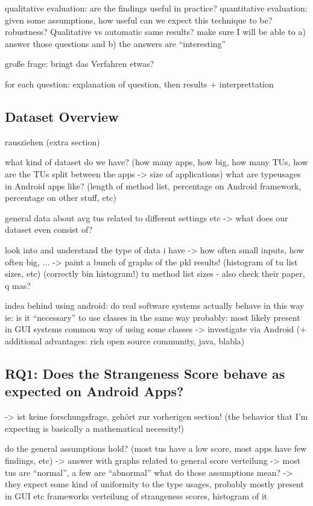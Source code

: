 qualitative evaluation: are the findings useful in practice?
quantitative evaluation: given some assumptions, how useful can we expect this technique to be? robustness? Qualitative vs automatic same results?
make sure I will be able to a) answer those questions and b) the answers are ``interesting''

große frage: bringt das Verfahren etwas?

for each question: explanation of question, then results + interprettation
\subsection{Dataset Overview}
rausziehen (extra section)

what kind of dataset do we have? (how many apps, how big, how many TUs, how are the TUs split between the apps -> size of applications)
what are typeusages in Android apps like? (length of method list, percentage on Android framework, percentage on other stuff, etc) 

general data about avg tus related to different settings etc -> what does our dataset even consist of?

look into and understand the type of data i have -> how often small inputs, how often big, ...
-> paint a bunch of graphs of the pkl results! (histogram of tu list sizes,  etc) (correctly bin histogram!)
 tu method list sizes - also check their paper, q mas?

indea behind using android:
    do real software systems actually behave in this way
    ie: is it ``necessary'' to use classes in the same way
    probably: most likely present in GUI systems
    common way of using some classes -> investigate via Android (+ additional advantages: rich open source community, java, blabla)

\subsection{RQ1: Does the Strangeness Score behave as expected on Android Apps?}
-> ist keine forschungsfrage, gehört zur vorherigen section!
(the behavior that I'm expecting is basically a mathematical necessity!)

do the general assumptions hold? (most tus have a low score, most apps have few findings, etc)
    -> answer with graphs related to general score verteilung
    -> most tus are ``normal'', a few are ``abnormal''
    what do those assumptions mean? -> they expect some kind of uniformity to the type usages, probably mostly present in GUI etc frameworks
verteilung of strangeness scores, histogram of it

